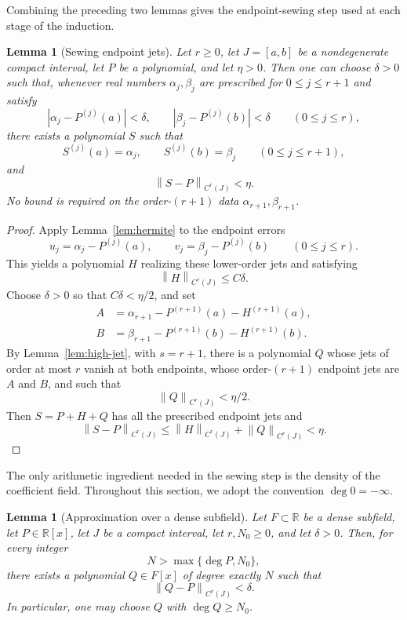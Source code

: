 \documentclass[11pt,reqno]{amsart}
\numberwithin{equation}{section}
\newtheorem{lemma}[theorem]{Lemma}
\theoremstyle{definition}
\theoremstyle{remark}
\newcommand{\R}{\mathbb R}
\newcommand{\norm}[1]{\left\lVert #1\right\rVert}
\begin{document}
Combining the preceding two lemmas gives the endpoint-sewing step used at each stage of the induction.

\begin{lemma}[Sewing endpoint jets]\label{lem:stitch}
Let $r\geq0$, let $J=[a,b]$ be a nondegenerate compact interval, let $P$ be a polynomial,
and let $\eta>0$. Then one can choose $\delta>0$ such that, whenever real
numbers $\alpha_j,\beta_j$ are prescribed for $0\leq j\leq r+1$ and satisfy
\[
|\alpha_j-P^{(j)}(a)|<\delta,
\qquad
|\beta_j-P^{(j)}(b)|<\delta
\qquad(0\leq j\leq r),
\]
there exists a polynomial $S$ such that
\[
S^{(j)}(a)=\alpha_j,
\qquad
S^{(j)}(b)=\beta_j
\qquad(0\leq j\leq r+1),
\]
and
\[
\norm{S-P}_{C^r(J)}<\eta.
\]
No bound is required on the order-$(r+1)$ data
$\alpha_{r+1},\beta_{r+1}$.
\end{lemma}

\begin{proof}
Apply Lemma~\ref{lem:hermite} to the endpoint errors
\[
u_j=\alpha_j-P^{(j)}(a),
\qquad
v_j=\beta_j-P^{(j)}(b)
\qquad(0\leq j\leq r).
\]
This yields a polynomial $H$ realizing these lower-order jets and satisfying
\[
\norm{H}_{C^r(J)}\leq C\delta.
\]
Choose $\delta>0$ so that $C\delta<\eta/2$, and set
\begin{align*}
A&=\alpha_{r+1}-P^{(r+1)}(a)-H^{(r+1)}(a),\\
B&=\beta_{r+1}-P^{(r+1)}(b)-H^{(r+1)}(b).
\end{align*}
By Lemma~\ref{lem:high-jet}, with $s=r+1$, there is a polynomial $Q$ whose jets of order at most $r$ vanish at both endpoints, whose order-$(r+1)$ endpoint jets are $A$ and $B$, and such that
\[
\norm{Q}_{C^r(J)}<\eta/2.
\]
Then $S=P+H+Q$ has all the prescribed endpoint jets and
\[
\norm{S-P}_{C^r(J)}
\leq \norm{H}_{C^r(J)}+\norm{Q}_{C^r(J)}
<\eta.
\]
\end{proof}

The only arithmetic ingredient needed in the sewing step is the density of the coefficient field. Throughout this section, we adopt the convention $\deg 0=-\infty$.

\begin{lemma}[Approximation over a dense subfield]\label{lem:dense-field}
Let $F\subset\R$ be a dense subfield, let $P\in\R[x]$, let $J$ be a compact
interval, let $r,N_0\geq0$, and let $\delta>0$. Then, for every integer
\[
N>\max\{\deg P,N_0\},
\]
there exists a polynomial $Q\in F[x]$ of degree exactly $N$ such that
\[
\norm{Q-P}_{C^r(J)}<\delta.
\]
In particular, one may choose $Q$ with $\deg Q\geq N_0$.
\end{lemma}
\end{document}
